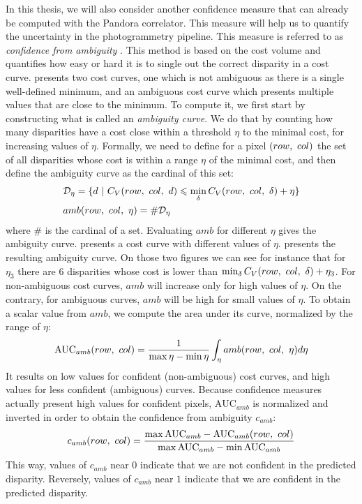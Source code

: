 In this thesis, we will also consider another confidence measure that can already be computed with the Pandora correlator. This measure will help us to quantify the uncertainty in the photogrammetry pipeline. This measure is referred to as \textit{confidence from ambiguity} \cite{sarrazin_ambiguity_2021}. This method is based on the cost volume and quantifies how easy or hard it is to single out the correct disparity in a cost curve.  presents two cost curves, one which is not ambiguous as there is a single well-defined minimum, and an ambiguous cost curve which presents multiple values that are close to the minimum. To compute it, we first start by constructing what is called an \textit{ambiguity curve}. We do that by counting how many disparities have a cost close within a threshold $\eta$ to the minimal cost, for increasing values of $\eta$. Formally, we need to define for a pixel $(row, ~col)$ the set of all disparities whose cost is within a range $\eta$ of the minimal cost, and then define the ambiguity curve as the cardinal of this set: 
\begin{align}
    &\mathcal{D}_\eta = \{d ~|~ C_V(row,~col,~d) \leqslant \min_\delta C_V(row, ~col, ~\delta) + \eta\}\\
    &amb(row, ~col, ~\eta) = \#\mathcal{D}_\eta
\end{align}
where $\#$ is the cardinal of a set. Evaluating $amb$ for different $\eta$ gives the ambiguity curve.  presents a cost curve with different values of $\eta$.  presents the resulting ambiguity curve. On those two figures we can see for instance that for $\eta_3$ there are $6$ disparities whose cost is lower than $\min_\delta C_V(row, ~col, ~\delta) + \eta_3$. For non-ambiguous cost curves, $amb$ will increase only for high values of $\eta$. On the contrary, for ambiguous curves, $amb$ will be high for small values of $\eta$. To obtain a scalar value from $amb$, we compute the area under its curve, normalized by the range of $\eta$:
\begin{equation}
    \mathrm{AUC}_{amb}(row, ~col) = \frac{1}{\max\eta-\min\eta}\int_\eta amb(row,~col,~\eta)d\eta
\end{equation}
It results on low values for confident (non-ambiguous) cost curves, and high values for less confident (ambiguous) curves. Because confidence measures actually present high values for confident pixels, $\mathrm{AUC}_{amb}$ is normalized and inverted in order to obtain the confidence from ambiguity $c_{amb}$:
\begin{equation}\label{eq:confidence_from_ambiguity}
    c_{amb}(row, ~col) = \frac{\max \mathrm{AUC}_{amb}- \mathrm{AUC}_{amb}(row, ~col)}{\max \mathrm{AUC}_{amb} -\min \mathrm{AUC}_{amb}}
\end{equation}
This way, values of $c_{amb}$ near $0$ indicate that we are not confident in the predicted disparity. Reversely, values of $c_{amb}$ near $1$ indicate that we are confident in the predicted disparity.

